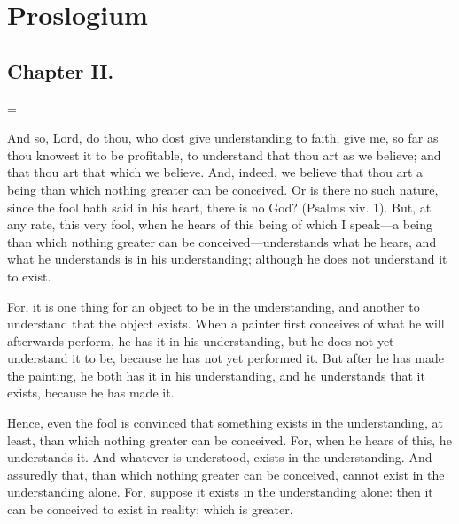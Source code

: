 
\author{Anselm of Canterbury}
\chapter[Anselm of Canterbury -- Proslogium, chaps. 2--4]{Proslogium}


\section*{Chapter II.}

\hangindent=\parindent
{}

\vspace{1\baselineskip}

And so, Lord, do thou, who dost give understanding to faith, give me,
so far as thou knowest it to be profitable, to understand that thou
art as we believe; and that thou art that which we believe. And,
indeed, we believe that thou art a being than which nothing greater
can be conceived. Or is there no such nature, since the fool hath said
in his heart, there is no God? (Psalms xiv. 1). But, at any rate,
this very fool, when he hears of this being of which I speak---a being
than which nothing greater can be con\-ceived---understands what he
hears, and what he understands is in his understanding; although he
does not understand it to exist.

For, it is one thing for an object to be in the understanding, and
another to understand that the object exists. When a painter first
conceives of what he will afterwards perform, he has it in his
understanding, but he does not yet understand it to be, because he has
not yet performed it. But after he has made the painting, he both has
it in his understanding, and he understands that it exists, because he
has made it.

Hence, even the fool is convinced that something exists in the
understanding, at least, than which nothing greater can be conceived.
For, when he hears of this, he understands it. And whatever is
understood, exists in the understanding. And assuredly that, than
which nothing greater can be conceived, cannot exist in the
understanding alone. For, suppose it exists in the understanding
alone: then it can be conceived to exist in reality; which is greater.


